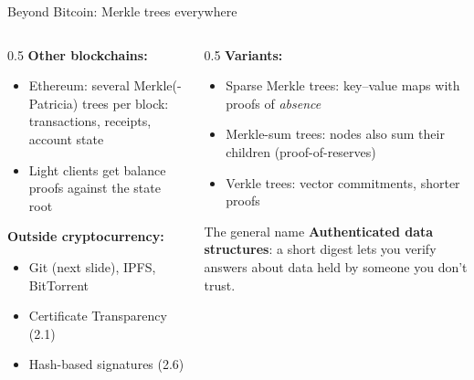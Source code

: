 \ifdefined\PRESENTATION\else\PassOptionsToClass{handout}{beamer}\fi\documentclass[aspectratio=169, lualatex]{beamer}
\begin{document}
\begin{frame}{Beyond Bitcoin: Merkle trees everywhere}
	\begin{columns}[c]
		\begin{column}{0.5\textwidth}
			\textbf{Other blockchains:}
			\begin{itemize}
				\item Ethereum: several Merkle(-Patricia) trees per block: transactions, receipts, account state
				\item Light clients get balance proofs against the state root
			\end{itemize}
			\textbf{Outside cryptocurrency:}
			\begin{itemize}
				\item Git (next slide), IPFS, BitTorrent
				\item Certificate Transparency (2.1)
				\item Hash-based signatures (2.6)
			\end{itemize}
		\end{column}
		\begin{column}{0.5\textwidth}
			\textbf{Variants:}
			\begin{itemize}
				\item Sparse Merkle trees: key--value maps with proofs of \emph{absence}
				\item Merkle-sum trees: nodes also sum their children (proof-of-reserves)
				\item Verkle trees: vector commitments, shorter proofs
			\end{itemize}
			\begin{exampleblock}{The general name}
				\textbf{Authenticated data structures}: a short digest lets you verify answers about data held by someone you don't trust.
			\end{exampleblock}
		\end{column}
	\end{columns}
\end{frame}
\end{document}
